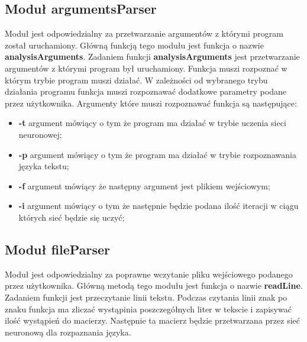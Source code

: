 \documentclass[8pt]{article}
\begin{document}
\subsection{Moduł argumentsParser}
\hspace*{1 cm} Moduł jest odpowiedzialny za przetwarzanie argumentów z którymi program został uruchamiony. Główną funkcją tego modułu jest funkcja o nazwie \textbf{analysisArguments}.\newline
\hspace*{1 cm} Zadaniem funkcji \textbf{analysisArguments} jest przetwarzanie  argumentów z którymi program był uruchamiony. Funkcja muszi rozpoznać w którym trybie program muszi działać. W zależności od wybranego trybu działania programu funkcja muszi rozpoznawać dodatkowe parametry podane przez użytkownika. Argumenty które muszi rozpoznawać funkcja są następujące:
\begin{itemize}
\item \textbf{-t} argument mówiący o tym że program ma działać w trybie uczenia sieci neuronowej;
\item \textbf{-p} argument mówiący o tym że program ma działać w trybie rozpoznawania języka tekstu;
\item \textbf{-f} argument mówiący że następny argument jest plikiem wejściowym;
\item \textbf{-i} argument mówiący o tym że następnie będzie podana ilość iteracji w ciągu których sieć będzie się uczyć;
\end{itemize}

\subsection{Moduł fileParser}
\hspace*{1 cm}Moduł jest odpowiedzialny za poprawne wczytanie pliku wejściowego podanego przez użytkownika. Główną metodą tego modułu jest funkcja o nazwie \textbf{readLine}. \newline
\hspace*{1 cm}Zadaniem funkcji jest przeczytanie linii tekstu. Podczas czytania linii znak po znaku funkcja ma zliczać wystąpinia poszczegółnych liter w tekscie i zapisywać ilość wystąpień do macierzy. Następnie ta macierz będzie przetwarzana przez sieć neuronową dla rozpaznania języka.
\end{document}
